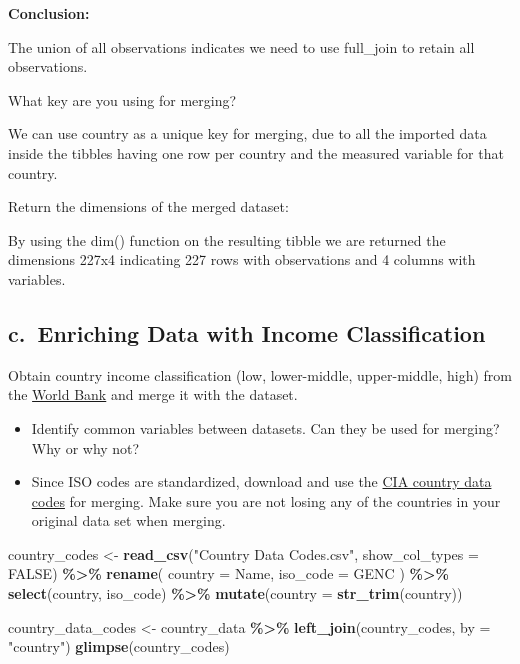 \documentclass[
]{article}
\newenvironment{Shaded}{\begin{snugshade}}{\end{snugshade}}
\newcommand{\AttributeTok}[1]{\textcolor[rgb]{0.13,0.29,0.53}{#1}}
\newcommand{\ConstantTok}[1]{\textcolor[rgb]{0.56,0.35,0.01}{#1}}
\newcommand{\FunctionTok}[1]{\textcolor[rgb]{0.13,0.29,0.53}{\textbf{#1}}}
\newcommand{\NormalTok}[1]{#1}
\newcommand{\OtherTok}[1]{\textcolor[rgb]{0.56,0.35,0.01}{#1}}
\newcommand{\SpecialCharTok}[1]{\textcolor[rgb]{0.81,0.36,0.00}{\textbf{#1}}}
\newcommand{\StringTok}[1]{\textcolor[rgb]{0.31,0.60,0.02}{#1}}
\begin{document}
\textbf{Conclusion:}

The union of all observations indicates we need to use full\_join to
retain all observations.

What key are you using for merging?

We can use country as a unique key for merging, due to all the imported
data inside the tibbles having one row per country and the measured
variable for that country.

Return the dimensions of the merged dataset:

By using the dim() function on the resulting tibble we are returned the
dimensions 227x4 indicating 227 rows with observations and 4 columns
with variables.

\subsection{c.~Enriching Data with Income
Classification}\label{c.-enriching-data-with-income-classification}

Obtain country income classification (low, lower-middle, upper-middle,
high) from the
\href{https://datahelpdesk.worldbank.org/knowledgebase/articles/906519}{World
Bank} and merge it with the dataset.

\begin{itemize}
\item
  Identify common variables between datasets. Can they be used for
  merging? Why or why not?
\item
  Since ISO codes are standardized, download and use the
  \href{https://www.cia.gov/the-world-factbook/references/country-data-codes/}{CIA
  country data codes} for merging. Make sure you are not losing any of
  the countries in your original data set when merging.
\end{itemize}

\begin{Shaded}
\begin{Highlighting}[]
\NormalTok{country\_codes }\OtherTok{\textless{}{-}} \FunctionTok{read\_csv}\NormalTok{(}\StringTok{"Country Data Codes.csv"}\NormalTok{, }\AttributeTok{show\_col\_types =} \ConstantTok{FALSE}\NormalTok{) }\SpecialCharTok{\%\textgreater{}\%}
  \FunctionTok{rename}\NormalTok{(}
    \AttributeTok{country =}\NormalTok{ Name,}
    \AttributeTok{iso\_code =}\NormalTok{ GENC}
\NormalTok{  ) }\SpecialCharTok{\%\textgreater{}\%}
  \FunctionTok{select}\NormalTok{(country, iso\_code) }\SpecialCharTok{\%\textgreater{}\%}
  \FunctionTok{mutate}\NormalTok{(}\AttributeTok{country =} \FunctionTok{str\_trim}\NormalTok{(country))}

\NormalTok{country\_data\_codes }\OtherTok{\textless{}{-}}\NormalTok{ country\_data }\SpecialCharTok{\%\textgreater{}\%}
  \FunctionTok{left\_join}\NormalTok{(country\_codes, }\AttributeTok{by =} \StringTok{"country"}\NormalTok{)}
\FunctionTok{glimpse}\NormalTok{(country\_codes)}
\end{Highlighting}
\end{Shaded}
\end{document}
